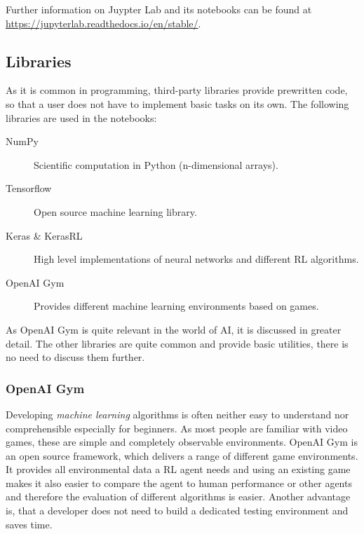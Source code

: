 \documentclass[10pt,a4paper]{article}
\begin{document}
		Further information on Juypter Lab and its notebooks can be found at \url{https://jupyterlab.readthedocs.io/en/stable/}.
		
		\subsection{Libraries}
		As it is common in programming, third-party libraries provide prewritten code, so that a user does not have to implement basic tasks on its own.
		The following libraries are used in the notebooks:
		\begin{description}
			\item[NumPy] Scientific computation in Python (n-dimensional arrays).
			\item[Tensorflow] Open source machine learning library.
			\item[Keras \& KerasRL] High level implementations of neural networks and different RL algorithms. 
			\item[OpenAI Gym] Provides different machine learning environments based on games.
		\end{description}
		
		\noindent As OpenAI Gym is quite relevant in the world of AI, it is discussed in greater detail. The other libraries are quite common and provide basic utilities, there is no need to discuss them further. 
		
		\subsubsection{OpenAI Gym}
		Developing \textit{machine learning} algorithms is often neither easy to understand nor comprehensible especially for beginners.
		As most people are familiar with video games, these are simple and completely observable environments.
		OpenAI Gym is an open source framework, which delivers a range of different game environments. It provides all environmental data a RL agent needs and using an existing game makes it also easier to compare the agent to human performance or other agents and therefore the evaluation of different algorithms is easier.
		Another advantage is, that a developer does not need to build a dedicated testing environment and saves time.
		
\end{document}
